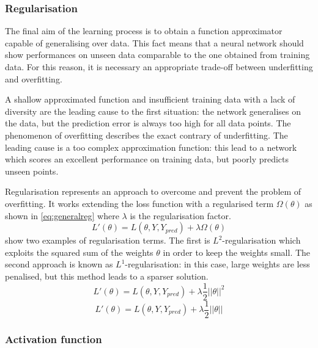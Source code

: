 \subsubsection{Regularisation}

The final aim of the learning process is to obtain a function approximator capable of generalising over data. This fact means that a neural network should show performances on unseen data comparable to the one obtained from training data. For this reason, it is necessary an appropriate trade-off between underfitting and overfitting.

A shallow approximated function and insufficient training data with a lack of diversity are the leading cause to the first situation: the network generalises on the data, but the prediction error is always too high for all data points.
The phenomenon of overfitting describes the exact contrary of underfitting. The leading cause is a too complex approximation function: this lead to a network which scores an excellent performance on training data, but poorly predicts unseen points.

Regularisation \cite{bishop2006pattern,lecun2015deep} represents an approach to overcome and prevent the problem of overfitting. It works extending the loss function with a regularised term $\Omega(\theta)$ as shown in \vref{eq:generalreg} where $\lambda$ is the regularisation factor.
\begin{equation}\label{eq:generalreg}
	L'(\theta) = L(\theta, Y, Y_{pred}) + \lambda \Omega(\theta)
\end{equation}
 show two examples of regularisation terms. The first is $L^2$-regularisation which exploits the squared sum of the weights $\theta$ in order to keep the weights small. The second approach is known as $L^1$-regularisation: in this case, large weights are less penalised, but this method leads to a sparser solution.
\begin{equation}\label{eq:l2reg}
	L'(\theta) = L(\theta, Y, Y_{pred}) + \lambda \frac{1}{2}||\theta||^2
\end{equation}
\begin{equation}\label{eq:l1reg}
	L'(\theta) = L(\theta, Y, Y_{pred}) + \lambda \frac{1}{2}||\theta||
\end{equation}


\subsubsection{Activation function}

